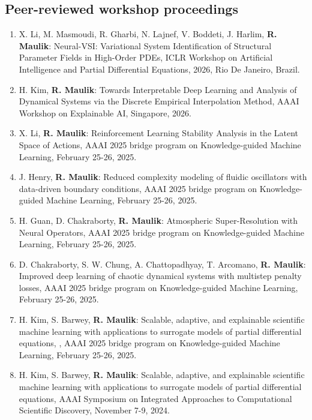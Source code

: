 \documentclass[letterpaper]{article}
\begin{document}
\subsection*{Peer-reviewed workshop proceedings}

\begin{enumerate}

\item X. Li, M. Masmoudi, R. Gharbi, N. Lajnef, V. Boddeti, J. Harlim, \textbf{R. Maulik}: Neural-VSI: Variational System Identification of Structural Parameter Fields in High-Order PDEs, ICLR Workshop on Artificial Intelligence and Partial Differential Equations, 2026, Rio De Janeiro, Brazil.

\item H. Kim, \textbf{R. Maulik}: Towards Interpretable Deep Learning and Analysis of Dynamical Systems via the Discrete Empirical Interpolation Method, AAAI Workshop on Explainable AI, Singapore, 2026.

\item X. Li, \textbf{R. Maulik}: Reinforcement Learning Stability Analysis in the Latent Space of Actions, AAAI 2025 bridge program on Knowledge-guided Machine Learning, February 25-26, 2025.

\item J. Henry, \textbf{R. Maulik}: Reduced complexity modeling of fluidic oscillators with data-driven boundary conditions, AAAI 2025 bridge program on Knowledge-guided Machine Learning, February 25-26, 2025.

\item H. Guan, D. Chakraborty, \textbf{R. Maulik}: Atmospheric Super-Resolution with Neural Operators, AAAI 2025 bridge program on Knowledge-guided Machine Learning, February 25-26, 2025.

\item D. Chakraborty, S. W. Chung, A. Chattopadhyay, T. Arcomano, \textbf{R. Maulik}: Improved deep learning of chaotic dynamical systems with multistep penalty losses, AAAI 2025 bridge program on Knowledge-guided Machine Learning, February 25-26, 2025.

\item H. Kim,  S. Barwey, \textbf{R. Maulik}: Scalable, adaptive, and explainable scientific machine learning with applications to surrogate models of partial differential equations, , AAAI 2025 bridge program on Knowledge-guided Machine Learning, February 25-26, 2025.

\item H. Kim, S. Barwey, \textbf{R. Maulik}: Scalable, adaptive, and explainable scientific machine learning with applications to surrogate models of partial differential equations, AAAI Symposium on Integrated Approaches to Computational Scientific Discovery, November 7-9, 2024.


\end{enumerate}
\end{document}
